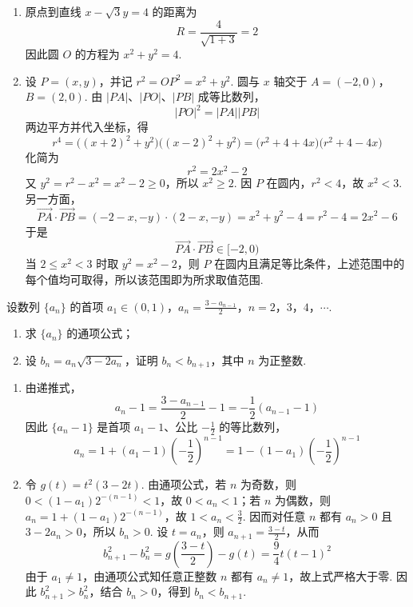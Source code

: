 \begin{solution}
\begin{enumerate}
\item 原点到直线 \(x-\sqrt3y=4\) 的距离为
\[
R=\frac{4}{\sqrt{1+3}}=2
\]
因此圆 \(O\) 的方程为 \(x^2+y^2=4\).

\item 设 \(P=(x,y)\)，并记 \(r^2=OP^2=x^2+y^2\). 圆与 \(x\) 轴交于 \(A=(-2,0)\)，\(B=(2,0)\). 由 \(|PA|\)、\(|PO|\)、\(|PB|\) 成等比数列，
\[
|PO|^2=|PA||PB|
\]
两边平方并代入坐标，得
\[
r^4=\bigl((x+2)^2+y^2\bigr)\bigl((x-2)^2+y^2\bigr)
=\bigl(r^2+4+4x\bigr)\bigl(r^2+4-4x\bigr)
\]
化简为
\[
r^2=2x^2-2
\]
又 \(y^2=r^2-x^2=x^2-2\geqslant0\)，所以 \(x^2\geqslant2\). 因 \(P\) 在圆内，\(r^2<4\)，故 \(x^2<3\). 另一方面，
\[
\overrightarrow{PA}\cdot\overrightarrow{PB}
=(-2-x,-y)\cdot(2-x,-y)=x^2+y^2-4=r^2-4=2x^2-6
\]
于是
\[
\overrightarrow{PA}\cdot\overrightarrow{PB}\in[-2,0)
\]
当 \(2\leqslant x^2<3\) 时取 \(y^2=x^2-2\)，则 \(P\) 在圆内且满足等比条件，上述范围中的每个值均可取得，所以该范围即为所求取值范围.
\end{enumerate}
\end{solution}

\begin{problem}
设数列 \(\{a_{n}\}\) 的首项 \(a_1 \in (0,1)\)，\(a_n = \frac{3 - a_{n-1}}{2}\)，\(n = 2\)，\(3\)，\(4\)，\(\cdots\).
\begin{enumerate}
\item 求 \( \{a_{n}\} \) 的通项公式；
\item 设 \( b_{n} = a_{n}\sqrt{3 - 2a_{n}} \)，证明 \( b_{n} < b_{n+1} \)，其中 \( n \) 为正整数.
\end{enumerate}
\end{problem}

\begin{solution}
\begin{enumerate}
\item 由递推式，
\[
a_n-1=\frac{3-a_{n-1}}{2}-1=-\frac12(a_{n-1}-1)
\]
因此 \(\{a_n-1\}\) 是首项 \(a_1-1\)、公比 \(-\frac12\) 的等比数列，
\[
a_n=1+(a_1-1)\left(-\frac12\right)^{n-1}=1-(1-a_1)\left(-\frac12\right)^{n-1}
\]

\item 令 \(g(t)=t^2(3-2t)\). 由通项公式，若 \(n\) 为奇数，则 \(0<(1-a_1)2^{-(n-1)}<1\)，故 \(0<a_n<1\)；若 \(n\) 为偶数，则 \(a_n=1+(1-a_1)2^{-(n-1)}\)，故 \(1<a_n<\frac32\). 因而对任意 \(n\) 都有 \(a_n>0\) 且 \(3-2a_n>0\)，所以 \(b_n>0\). 设 \(t=a_n\)，则 \(a_{n+1}=\frac{3-t}{2}\)，从而
\[
b_{n+1}^2-b_n^2
=g\left(\frac{3-t}{2}\right)-g(t)
=\frac{9}{4}t(t-1)^2
\]
由于 \(a_1\ne1\)，由通项公式知任意正整数 \(n\) 都有 \(a_n\ne1\)，故上式严格大于零. 因此 \(b_{n+1}^2>b_n^2\)，结合 \(b_n>0\)，得到 \(b_n<b_{n+1}\).
\end{enumerate}
\end{solution}

